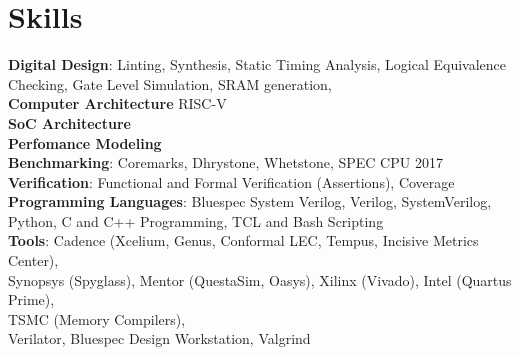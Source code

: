 \section{\sc Skills}
{\bf{Digital Design}}: Linting, Synthesis, Static Timing Analysis, Logical Equivalence Checking, Gate Level Simulation, SRAM generation,  \\
{\bf{Computer Architecture}} RISC-V \\
{\bf{SoC Architecture}} \\
{\bf{Perfomance Modeling}} \\
{\bf{Benchmarking}}: Coremarks, Dhrystone, Whetstone, SPEC CPU 2017 \\
{\bf{Verification}}: Functional and Formal Verification (Assertions), Coverage \\
{\bf{Programming Languages}}: Bluespec System Verilog, Verilog, SystemVerilog, Python, C and C++ Programming, TCL and Bash Scripting  \\
{\bf{Tools}}: Cadence (Xcelium, Genus,  Conformal LEC, Tempus, Incisive Metrics Center), \\ Synopsys (Spyglass), Mentor (QuestaSim, Oasys), Xilinx (Vivado), Intel (Quartus Prime), \\ TSMC (Memory Compilers), \\ Verilator, Bluespec Design Workstation, Valgrind 

\endinput
